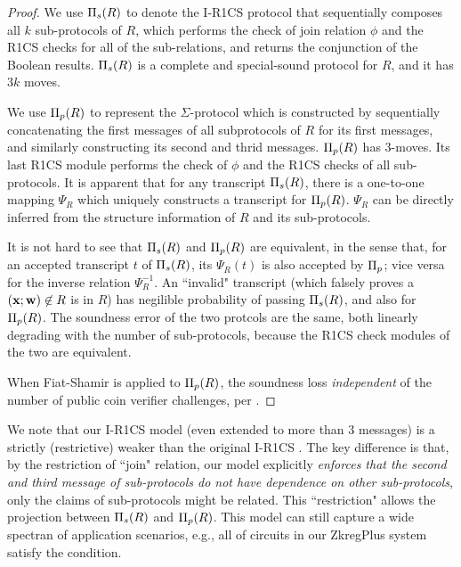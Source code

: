 \begin{proof} 
We use ${\large{\Pi}}_s(R)$ to denote the I-R1CS protocol that sequentially
composes all $k$ sub-protocols of $R$, which performs
the check of join relation $\phi$ and the R1CS checks for
all of the sub-relations, and returns the conjunction of the Boolean
results. ${\large{\Pi}}_s(R)$ is a complete and special-sound protocol
for $R$, and it has $3k$ moves.

We use ${\large{\Pi}}_p(R)$
to represent the $\Sigma$-protocol which is constructed by
sequentially concatenating the first messages of all 
subprotocols of $R$ for its first messages, and similarly
constructing its second and thrid messages.
${\large{\Pi}}_p(R)$ has $3$-moves. Its last R1CS module
performs the check of $\phi$ and the R1CS checks of all
sub-protocols.
It is apparent that for any transcript ${\large{\Pi}}_s(R)$,
there is a one-to-one mapping $\Psi_R$ which uniquely
constructs a transcript for ${\large{\Pi}}_p(R)$. $\Psi_R$ can 
be directly inferred from the structure information of $R$
and its sub-protocols.

It is not hard to see that ${\large{\Pi}}_s(R)$ and ${\large{\Pi}}_p(R)$
are equivalent, in the sense that, for an accepted transcript $t$ 
of ${\large{\Pi}}_s(R)$, its $\Psi_R(t)$ is also accepted by ${\large{\Pi}}_p$;
vice versa for the inverse relation $\Psi_R^{{-1}}$.
An ``invalid" transcript (which falsely proves a 
$({{\mathbf {x}}};{{\mathbf {w}}}) \not\in R$
is in $R$) has negilible probability of passing ${\large{\Pi}}_s(R)$,
and also for ${\large{\Pi}}_p(R)$. The soundness error of the two protcols
are the same, both linearly degrading with the number of sub-protocols,
because the R1CS check modules of the two are equivalent.

When Fiat-Shamir is applied to ${\large{\Pi}}_p(R)$,
the soundness loss {\em independent} of the number of public coin verifier 
challenges, per \cite{SpecialFiat}.
\end{proof}

We note that our I-R1CS model (even extended to more than
$3$ messages) is a strictly (restrictive) weaker 
than the original I-R1CS \cite{AIPRam}. The key difference is that, by 
the restriction of ``join" relation, our model explicitly {\em enforces that
the second and third message of sub-protocols do not have
dependence on other sub-protocols}, only the claims of sub-protocols
might be related. This ``restriction" allows the projection between
${\large{\Pi}}_s(R)$ and ${\large{\Pi}}_p(R)$. This model can still capture
a wide spectran of application scenarios, e.g., all of circuits
in our ZkregPlus system satisfy the condition. 

